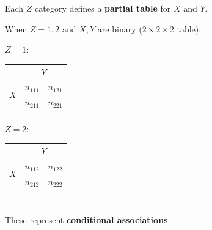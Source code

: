 \documentclass[11pt]{elegantbook}
\begin{document}
\begin{definition}
    Each $Z$ category defines a \textbf{partial table} for $X$ and $Y$.
\end{definition}
\begin{example}
    When $Z = 1, 2$ and $X , Y$ are binary ($2\times 2 \times 2$ table):
    \begin{table}[htbp]
        \centering
        $Z=1:$
        \begin{tabular}{rllll}
            \multicolumn{1}{c}{}                    & \multicolumn{4}{c}{$Y$}                                 \\ \cline{2-5} 
            \multicolumn{1}{r|}{\multirow{2}{*}{$X$}} & \multicolumn{2}{l|}{$n_{111}$} & \multicolumn{2}{l|}{$n_{121}$} \\ \cline{2-5} 
            \multicolumn{1}{r|}{}                   & \multicolumn{2}{l|}{$n_{211}$} & \multicolumn{2}{l|}{$n_{221}$} \\ \cline{2-5}
            \multicolumn{1}{l}{}                    &             &             &             &
        \end{tabular}\quad\quad
        $Z=2:$
        \begin{tabular}{rllll}
            \multicolumn{1}{c}{}                    & \multicolumn{4}{c}{$Y$}                                 \\ \cline{2-5} 
            \multicolumn{1}{r|}{\multirow{2}{*}{$X$}} & \multicolumn{2}{l|}{$n_{112}$} & \multicolumn{2}{l|}{$n_{122}$} \\ \cline{2-5} 
            \multicolumn{1}{r|}{}                   & \multicolumn{2}{l|}{$n_{212}$} & \multicolumn{2}{l|}{$n_{222}$} \\ \cline{2-5}
            \multicolumn{1}{l}{}                    &             &             &             &
        \end{tabular}\\
        These represent \textbf{conditional associations}.
    \end{table}\\
\end{example}
\end{document}
